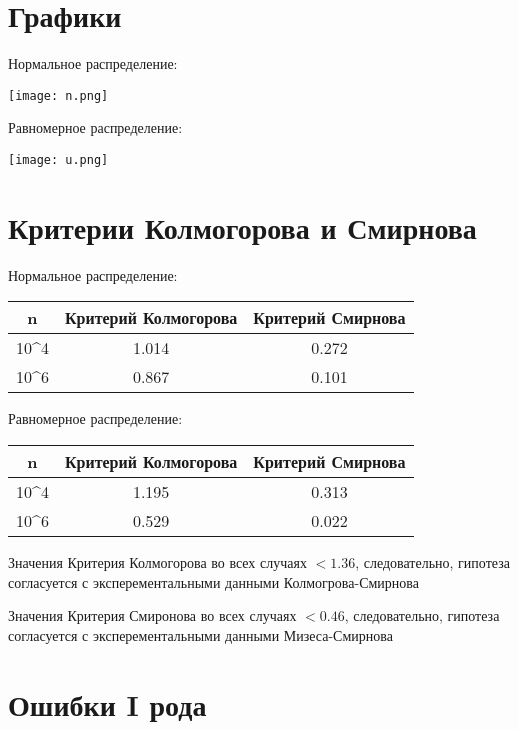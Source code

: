 \documentclass[12pt, a4paper]{article}
\begin{document}
\section{Графики}

Нормальное распределение:

\texttt{[image: n.png]}

Равномерное распределение:

\texttt{[image: u.png]}

\newpage

\section{Критерии Колмогорова и Смирнова}

Нормальное распределение:
\begin{center}
    \begin{tabular}{|c|c|c|}
         \hline \textbf{n} & \textbf{Критерий Колмогорова} & \textbf{Критерий Смирнова} \\
         \hline 10^4 & 1.014 & 0.272 \\
         \hline 10^6 & 0.867 & 0.101 \\
         \hline
    \end{tabular}
\end{center}


Равномерное распределение:
\begin{center}
    \begin{tabular}{|c|c|c|}
         \hline \textbf{n} & \textbf{Критерий Колмогорова} & \textbf{Критерий Смирнова} \\
         \hline 10^4 & 1.195 & 0.313 \\
         \hline 10^6 & 0.529 & 0.022 \\
         \hline
    \end{tabular}
\end{center}

Значения Критерия Колмогорова во всех случаях $< 1.36$, следовательно, гипотеза согласуется с эксперементальными данными Колмогрова-Смирнова

Значения Критерия Смиронова во всех случаях $< 0.46$, следовательно, гипотеза согласуется с эксперементальными данными Мизеса-Смирнова

\newpage

\section{Ошибки I рода}
\end{document}
